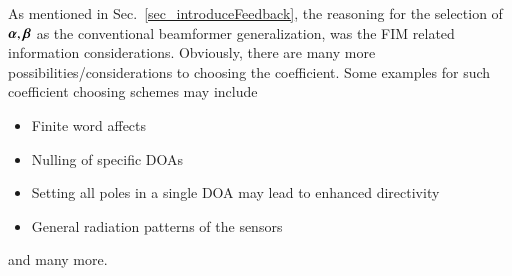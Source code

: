 As mentioned in Sec.~\ref{sec_introduceFeedback}, the reasoning for the selection of $\boldsymbol{\alpha}, \boldsymbol{\beta}$ as the conventional beamformer generalization, was the FIM related information considerations.
Obviously, there are many more possibilities/considerations to choosing the coefficient.
Some examples for such coefficient choosing schemes may include
\begin{itemize}
    \item Finite word affects
    \item Nulling of specific DOAs
    \item Setting all poles in a single DOA may lead to enhanced directivity
    \item General radiation patterns of the sensors
\end{itemize}
and many more.